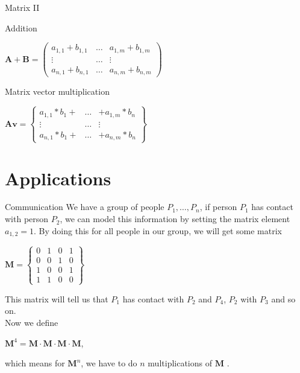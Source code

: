 \documentclass[12pt,t]{beamer}
\begin{document}
\begin{frame}{Matrix II}

\begin{block}{Addition}
\begin{center}
$ \mathbf{A} + \mathbf{B}  = \begin{pmatrix}
a_{1,1} + b_{1,1}  & \ldots & a_{1,m} + b_{1,m} \\
\vdots & \ldots & \vdots \\
a_{n,1} + b_{n,1} & \ldots & a_{n,m} + b_{n,m} 
\end{pmatrix} $
\end{center}
\end{block}

\begin{block}{Matrix vector multiplication}
\begin{center}
$ \mathbf{A}  \mathbf{v}  = \left\lbrace\begin{matrix}
a_{1,1} * b_{1} + & \ldots & + a_{1,m} * b_{n} \\
\vdots & \ldots & \vdots \\
a_{n,1} * b_{1} + & \ldots & + a_{n,m} * b_{n} 
\end{matrix} \right\rbrace $
\end{center}
\end{block}

\end{frame}


\section{Applications}


\begin{frame}{Communication}
We have a group of people $P_1,\ldots,P_n$, if person $P_1$ has contact with person $P_2$, we can model this information by setting the matrix element $a_{1,2}=1$. By doing this for all people in our group, we will get some matrix \\

\begin{center}
$
\mathbf{M} = \left\lbrace\begin{matrix}
0 & 1 & 0 & 1 \\
0 & 0 & 1 & 0 \\
1 & 0 & 0 & 1 \\
1 & 1 & 0 & 0
\end{matrix} \right\rbrace
$
\end{center}
This matrix will tell us that $P_1$ has contact with $P_2$ and $P_4$, $P_2$ with $P_3$ and so on. \\
Now we define
\begin{center}
$\mathbf{M}^4 = \mathbf{M} \cdot \mathbf{M} \cdot \mathbf{M} \cdot \mathbf{M} $,  
\end{center}
which means for $\mathbf{M}^n$, we have to do $n$ multiplications of $\mathbf{M}$ .
\end{frame}
\end{document}

